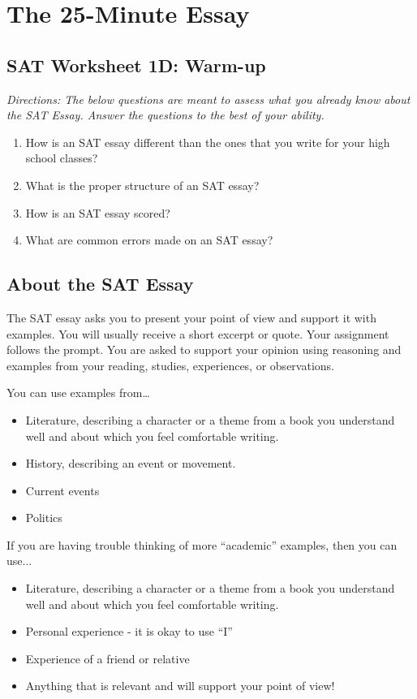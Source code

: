 
\chapter{The 25-Minute Essay}
\section{SAT Worksheet 1D: Warm-up}
\textit{Directions: The below questions are meant to assess what you already know about the SAT Essay. Answer the questions to the best of your ability. }\\

\begin{enumerate}
\item{How is an SAT essay different than the ones that you write for your high school classes?}


\vfill
\item{What is the proper structure of an SAT essay?}


\vfill
\item{How is an SAT essay scored?}


\vfill
\item{What are common errors made on an SAT essay?}

\end{enumerate}
\vfill

\pagebreak
\section{About the SAT Essay}
The SAT essay asks you to present your point of view and support it with examples.  You will usually receive a short excerpt or quote.  Your assignment follows the prompt.  You are asked to support your opinion using reasoning and examples from your reading, studies, experiences, or observations.

\bigskip
You can use examples from…
\begin{itemize}
\item{Literature, describing a character or a theme from a book you understand well and about which you feel comfortable writing.}  
\item{History, describing an event or movement.}
\item{Current events}
\item{Politics}
\end{itemize}

\bigskip
If you are having trouble thinking of more “academic” examples, then you can use...
\begin{itemize}
\item{Literature, describing a character or a theme from a book you understand well and about which you feel comfortable writing.}  
\item{Personal experience - it is okay to use “I”}
\item{Experience of a friend or relative}
\item{Anything that is relevant and will support your point of view!}
\end{itemize}

